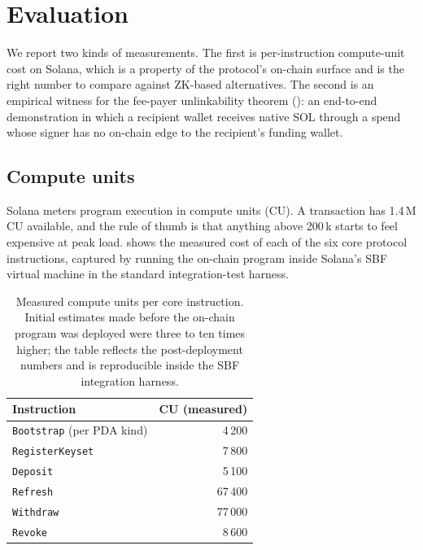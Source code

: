 \section{Evaluation}
\label{sec:evaluation}

We report two kinds of measurements. The first is per-instruction compute-unit cost on Solana, which is a property of the protocol's on-chain surface and is the right number to compare against ZK-based alternatives. The second is an empirical witness for the fee-payer unlinkability theorem (): an end-to-end demonstration in which a recipient wallet receives native SOL through a spend whose signer has no on-chain edge to the recipient's funding wallet.

\subsection{Compute units}
\label{sec:eval-cu}

Solana meters program execution in compute units (CU). A transaction has 1.4\,M CU available, and the rule of thumb is that anything above 200\,k starts to feel expensive at peak load.  shows the measured cost of each of the six core protocol instructions, captured by running the on-chain program inside Solana's SBF virtual machine in the standard integration-test harness.

\begin{table}[ht]
\centering
\small
\begin{tabular}{lr}
\toprule
Instruction & CU (measured) \\
\midrule
\texttt{Bootstrap} (per PDA kind) & 4\,200 \\
\texttt{RegisterKeyset}            & 7\,800 \\
\texttt{Deposit}                   & 5\,100 \\
\texttt{Refresh}                   & 67\,400 \\
\texttt{Withdraw}                  & 77\,000 \\
\texttt{Revoke}                    & 8\,600 \\
\bottomrule
\end{tabular}
\caption{Measured compute units per core instruction. Initial estimates made before the on-chain program was deployed were three to ten times higher; the table reflects the post-deployment numbers and is reproducible inside the SBF integration harness.}
\label{tab:cu}
\end{table}

